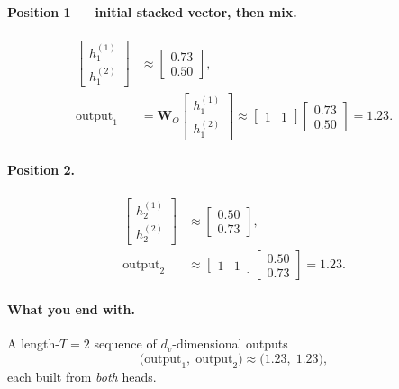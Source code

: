 \documentclass[11pt]{article}
\begin{document}
\paragraph{Position 1 --- initial stacked vector, then mix.}
\begin{align*}
  \begin{bmatrix} h_1^{(1)} \\ h_1^{(2)} \end{bmatrix}
  &\approx
  \begin{bmatrix} 0.73 \\ 0.50 \end{bmatrix}, \\[0.3em]
  \text{output}_1
  &=
  \mathbf{W}_O
  \begin{bmatrix} h_1^{(1)} \\ h_1^{(2)} \end{bmatrix}
  \approx
  \begin{bmatrix}1&1\end{bmatrix}
  \begin{bmatrix}0.73\\0.50\end{bmatrix}
  = 1.23.
\end{align*}

\paragraph{Position 2.}
\begin{align*}
  \begin{bmatrix} h_2^{(1)} \\ h_2^{(2)} \end{bmatrix}
  &\approx
  \begin{bmatrix} 0.50 \\ 0.73 \end{bmatrix}, \\[0.3em]
  \text{output}_2
  &\approx
  \begin{bmatrix}1&1\end{bmatrix}
  \begin{bmatrix}0.50\\0.73\end{bmatrix}
  = 1.23.
\end{align*}

\paragraph{What you end with.}
A length-\(T=2\) sequence of \(d_v\)-dimensional outputs
\[
  \bigl(\text{output}_1,\;\text{output}_2\bigr)
  \approx
  \bigl(1.23,\; 1.23\bigr),
\]
each built from \emph{both} heads.
\end{document}
